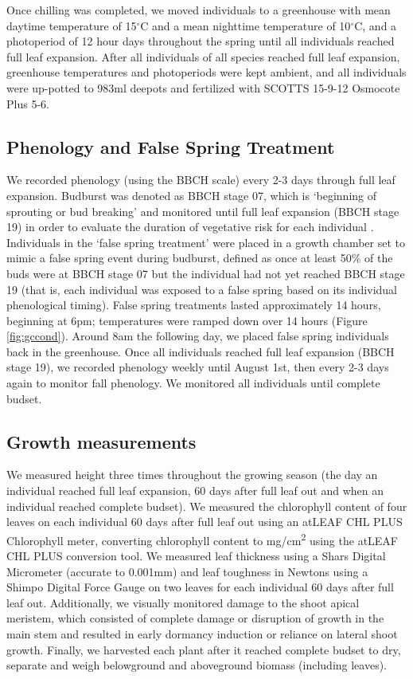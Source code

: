 \documentclass{article}\usepackage[]{graphicx}\usepackage[]{color}
\begin{document}
Once chilling was completed, we moved individuals to a greenhouse with mean daytime temperature of 15$^{\circ}$C and a mean nighttime temperature of 10$^{\circ}$C, and a photoperiod of 12 hour days throughout the spring until all individuals reached full leaf expansion. After all individuals of all species reached full leaf expansion, greenhouse temperatures and photoperiods were kept ambient, and all individuals were up-potted to 983ml deepots and fertilized with SCOTTS 15-9-12 Osmocote Plus 5-6. 

\subsection*{Phenology and False Spring Treatment}
We recorded phenology (using the BBCH scale) every 2-3 days through full leaf expansion. Budburst was denoted as BBCH stage 07, which is `beginning of sprouting or bud breaking' and monitored until full leaf expansion (BBCH stage 19) in order to evaluate the duration of vegetative risk \citep{Chamberlain2019} for each individual \citep{Finn2007}. Individuals in the `false spring treatment' were placed in a growth chamber set to mimic a false spring event during budburst, defined as once at least 50\% of the buds were at BBCH stage 07 but the individual had not yet reached BBCH stage 19 (that is, each individual was exposed to a false spring based on its individual phenological timing). False spring treatments lasted approximately 14 hours, beginning at 6pm; temperatures were ramped down over 14 hours (Figure \ref{fig:gccond}). Around 8am the following day, we placed false spring individuals back in the greenhouse. Once all individuals reached full leaf expansion (BBCH stage 19), we recorded phenology weekly until August 1st, then every 2-3 days again to monitor fall phenology. We monitored all individuals until complete budset. 

\subsection*{Growth measurements}
We measured height three times throughout the growing season (the day an individual reached full leaf expansion, 60 days after full leaf out and when an individual reached complete budset). We measured the chlorophyll content of four leaves on each individual 60 days after full leaf out using an atLEAF CHL PLUS Chlorophyll meter, converting chlorophyll content to mg/cm\textsuperscript{2} using the atLEAF CHL PLUS conversion tool. We measured leaf thickness using a Shars Digital Micrometer (accurate to 0.001mm) and leaf toughness in Newtons using a Shimpo Digital Force Gauge on two leaves for each individual 60 days after full leaf out. Additionally, we visually monitored damage to the shoot apical meristem, which consisted of complete damage or disruption of growth in the main stem and resulted in early dormancy induction or reliance on lateral shoot growth. Finally, we harvested each plant after it reached complete budset to dry, separate and weigh belowground and aboveground biomass (including leaves). 
\end{document}

